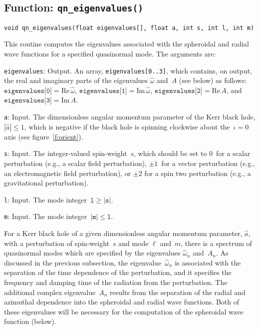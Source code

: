 \clearpage
\subsection{Function: \texttt{qn\_eigenvalues()}}
\label{ss:qn_eigenvalues}

\begin{verbatim}
void qn_eigenvalues(float eigenvalues[], float a, int s, int l, int m)
\end{verbatim}
This routine computes the eigenvalues associated with the spheroidal and
radial wave functions for a specified quasinormal mode.  The arguments are:
\begin{description}
\item{\texttt{eigenvalues}}: Output.  An array, \texttt{eigenvalues[0..3]},
  which contains, on output, the real and imaginary parts of the eigenvalues
  $\hat{\omega}$ and~$A$ (see below) as follows:
  $\texttt{eigenvalues[0]}={\mathrm{Re}}\,\hat{\omega}$,
  $\texttt{eigenvalues[1]}={\mathrm{Im}}\,\hat{\omega}$,
  $\texttt{eigenvalues[2]}={\mathrm{Re}}\,A$,
  and~$\texttt{eigenvalues[3]}={\mathrm{Im}}\,A$.
\item{\texttt{a}}: Input.  The dimensionless angular momentum parameter
  of the Kerr black hole, $|\hat{a}|\le1$, which is negative if the black hole
  is spinning clockwise about the~$\iota=0$ axis (see figure~\ref{f:orient}).
\item{\texttt{s}}: Input.  The integer-valued spin-weight~$s$, which should
  be set to $0$~for a scalar perturbation (e.g., a scalar field perturbation),
  $\pm1$~for a vector perturbation (e.g., an electromagnetic field
  perturbation), or $\pm2$ for a spin two perturbation (e.g., a gravitational
  perturbation).
\item{\texttt{l}}: Input.  The mode integer~$\texttt{l}\ge|\texttt{s}|$.
\item{\texttt{m}}: Input.  The mode integer~$|\texttt{m}|\le\texttt{l}$.
\end{description}

For a Kerr black hole of a given dimensionless angular momentum parameter,
$\hat{a}$, with a
perturbation of spin-weight~$s$ and mode $\ell$ and~$m$, there is a spectrum
of quasinormal modes which are specified by the eigenvalues $\hat{\omega}_n$
and~$A_n$.  As discussed in the previous subsection, the
eigenvalue~$\hat{\omega}_n$ is associated with the separation of the time
dependence of the perturbation, and it specifies the frequency and damping
time of the radiation from the perturbation.  The additional complex
eigenvalue~$A_n$ results from the separation of the radial and azimuthal
dependence into the spheroidal and radial wave functions.  Both of these
eigenvalues will be necessary for the computation of the spheroidal wave
function (below).

